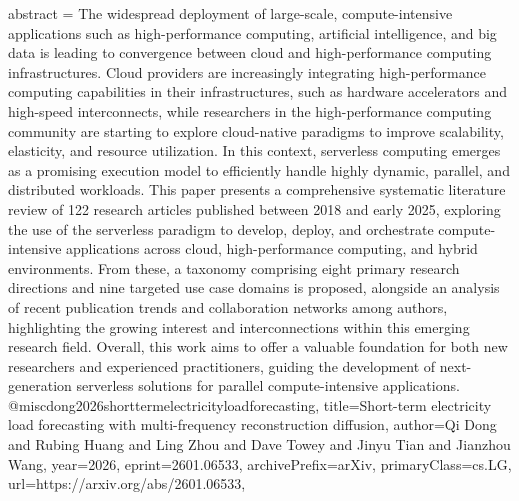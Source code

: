 {      abstract = {The widespread deployment of large-scale, compute-intensive applications such as high-performance computing, artificial intelligence, and big data is leading to convergence between cloud and high-performance computing infrastructures. Cloud providers are increasingly integrating high-performance computing capabilities in their infrastructures, such as hardware accelerators and high-speed interconnects, while researchers in the high-performance computing community are starting to explore cloud-native paradigms to improve scalability, elasticity, and resource utilization. In this context, serverless computing emerges as a promising execution model to efficiently handle highly dynamic, parallel, and distributed workloads. This paper presents a comprehensive systematic literature review of 122 research articles published between 2018 and early 2025, exploring the use of the serverless paradigm to develop, deploy, and orchestrate compute-intensive applications across cloud, high-performance computing, and hybrid environments. From these, a taxonomy comprising eight primary research directions and nine targeted use case domains is proposed, alongside an analysis of recent publication trends and collaboration networks among authors, highlighting the growing interest and interconnections within this emerging research field. Overall, this work aims to offer a valuable foundation for both new researchers and experienced practitioners, guiding the development of next-generation serverless solutions for parallel compute-intensive applications.}
}@misc{dong2026shorttermelectricityloadforecasting,
      title={Short-term electricity load forecasting with multi-frequency reconstruction diffusion}, 
      author={Qi Dong and Rubing Huang and Ling Zhou and Dave Towey and Jinyu Tian and Jianzhou Wang},
      year={2026},
      eprint={2601.06533},
      archivePrefix={arXiv},
      primaryClass={cs.LG},
      url={https://arxiv.org/abs/2601.06533},
}
